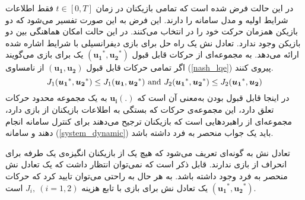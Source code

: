در این حالت فرض شده است که تمامی بازیکنان در زمان 
$t \in [0, T]$
فقط اطلاعات شرایط اولیه و مدل سامانه را دارند. این فرض به این صورت تفسیر می‌شود که دو بازیکن همزمان حرکت خود را در انتخاب می‌کنند. در این حالت امکان هماهنگی بین دو بازیکن وجود ندارد. تعادل نش یک راه حل برای بازی دیفرانسیلی با شرایط اشاره شده ارائه می‌دهد.
به مجموعه‌ای از حرکات قابل قبول 
$(\boldsymbol{u_1}^*,  \boldsymbol{u_2}^*)$
یک  برای بازی می‌گویند اگر تمامی حرکات قابل قبول 
$(\boldsymbol{u_1},  \boldsymbol{u_2})$
از نامساوی (\ref{nash_lqe}) پیروی کنند.
\begin{equation}\label{nash_lqe}
	J_1(\boldsymbol{u_1}^*, \boldsymbol{u_2}^*)\leq J_1(\boldsymbol{u_1}, \boldsymbol{u_2}^*) \text{\rm{ and }}
	J_2(\boldsymbol{u_1}^*, \boldsymbol{u_2}^*)\leq 
	J_2(\boldsymbol{u_1}^*, \boldsymbol{u_2})
\end{equation}
در اینجا قابل قبول بودن به‌معنی آن است که
$\boldsymbol{u_i}(.)$
به یک مجموعه محدود حرکات تعلق دارد، این مجموعه‌ی حرکات که بستگی به اطلاعات بازیکنان از بازی دارد، مجموعه‌ای از راهبردهایی است که بازیکنان ترجیح می‌دهند برای کنترل سامانه انجام دهند و سامانه 
(\ref{system_dynamic})
باید یک جواب منحصر به فرد داشته باشد. 


تعادل نش به گونه‌ای تعریف می‌شود که هیچ یک از بازیکنان انگیزه‌ی یک طرفه برای انحراف از بازی ندارند. قابل ذکر است که نمی‌توان انتظار داشت که یک تعادل نش منحصر به فرد وجود داشته باشد. به هر حال به راحتی می‌توان تایید کرد که حرکات
$(\boldsymbol{u_1}^*, \boldsymbol{u_2}^*)$
یک تعادل نش برای بازی با تابع هزینه
$J_i,~ (i = 1, 2)$
است.